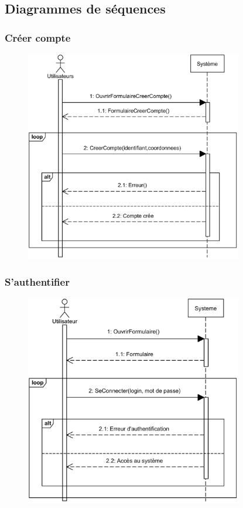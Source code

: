 \subsection[Diagrammes de séquences]{Diagrammes de séquences}
    \subsubsection[Créer compte]{Créer compte}
        \begin{figure}[H]
            \centering
            \includegraphics[width=95mm]{images/sd-creer-compte.png}
            \label{fig:sdCreerCompte}
        \end{figure}
    \subsubsection[S’authentifier]{S’authentifier}
        \begin{figure}[H]
            \centering
            \includegraphics[width=95mm]{images/sd-authentifier.png}
            \label{fig:sdAuthentifier}
        \end{figure}
\pagebreak
